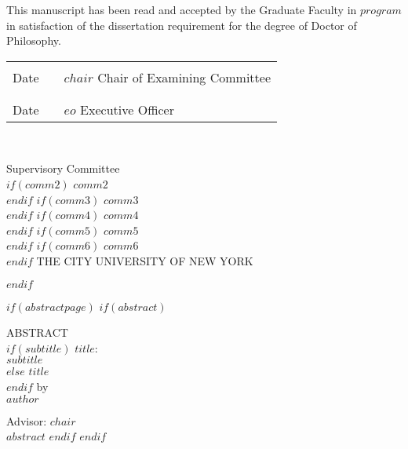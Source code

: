 \documentclass[$if(draft)$$draft$,$endif$$if(fontsize)$$fontsize$,$endif$$if(lang)$$babel-lang$,$endif$$if(papersize)$$papersize$,$endif$$if(sides)$$sides$,$endif$$for(classoption)$$classoption$$sep$,$endfor$]{$documentclass$}
\begin{document}
\begin{changemargin}{0.5in}{0.5in}
\singlespacing
\raggedright
This manuscript has been read and accepted by the Graduate Faculty in $program$ in satisfaction of the dissertation requirement for the degree of Doctor of Philosophy.
\end{changemargin}

\vspace{0.75in}

\setlength{\tabcolsep}{0pt}
\hspace*{-0.5in}
\doublespacing
\begin{tabular}[t]{p{1.75in}p{1.0in}p{3.5in}}
\hrulefill& &\hrulefill \\
Date & & $chair$ \newline Chair of Examining Committee\\
\\
\hrulefill& &\hrulefill \\
Date & & $eo$ \newline Executive Officer\\
\end{tabular}\\[0.5in]

\begin{center}
\doublespacing
Supervisory Committee \\
$if(comm2)$
  $comm2$ \\
$endif$
$if(comm3)$
  $comm3$ \\
$endif$
$if(comm4)$
  $comm4$ \\
$endif$
$if(comm5)$
  $comm5$ \\
$endif$
$if(comm6)$
  $comm6$ \\
$endif$
\vspace{\fill}
\uppercase{The City University of New York}
\end{center}
$endif$

$if(abstractpage)$
$if(abstract)$
\clearpage{}
{}
\label{chap:abstract}
\begin{center}%
  \singlespacing
  ABSTRACT \\[2em]
  $if(subtitle)$
  $title$:\\
  $subtitle$\\[1em]
  $else$
  $title$\\[1em]
  $endif$
  by \\[1em]
  $author$ \\[0.25in]
\end{center}
\vspace{0.25in}
{\setlength{\parindent}{0pt}
Advisor: $chair$\\[1em]
\vspace{0.25in}
$abstract$
}
$endif$
$endif$
\end{document}
